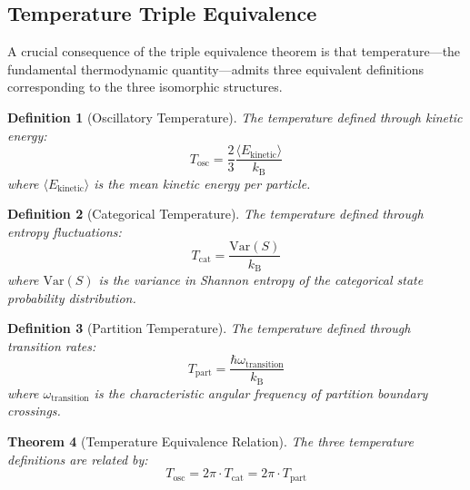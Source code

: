 \documentclass[twocolumn,10pt]{article}
\newtheorem{theorem}{Theorem}[section]
\newtheorem{definition}[theorem]{Definition}
\theoremstyle{remark}
\newcommand{\kB}{k_{\mathrm{B}}}
\begin{document}
\subsection{Temperature Triple Equivalence}

A crucial consequence of the triple equivalence theorem is that temperature---the fundamental thermodynamic quantity---admits three equivalent definitions corresponding to the three isomorphic structures.

\begin{definition}[Oscillatory Temperature]
The temperature defined through kinetic energy:
\begin{equation}
T_{\mathrm{osc}} = \frac{2}{3} \frac{\langle E_{\mathrm{kinetic}} \rangle}{\kB}
\end{equation}
where $\langle E_{\mathrm{kinetic}} \rangle$ is the mean kinetic energy per particle.
\end{definition}

\begin{definition}[Categorical Temperature]
The temperature defined through entropy fluctuations:
\begin{equation}
T_{\mathrm{cat}} = \frac{\mathrm{Var}(S)}{\kB}
\end{equation}
where $\mathrm{Var}(S)$ is the variance in Shannon entropy of the categorical state probability distribution.
\end{definition}

\begin{definition}[Partition Temperature]
The temperature defined through transition rates:
\begin{equation}
T_{\mathrm{part}} = \frac{\hbar \omega_{\mathrm{transition}}}{\kB}
\end{equation}
where $\omega_{\mathrm{transition}}$ is the characteristic angular frequency of partition boundary crossings.
\end{definition}

\begin{theorem}[Temperature Equivalence Relation]
\label{thm:temp_equiv}
The three temperature definitions are related by:
\begin{equation}
\boxed{T_{\mathrm{osc}} = 2\pi \cdot T_{\mathrm{cat}} = 2\pi \cdot T_{\mathrm{part}}}
\end{equation}
\end{theorem}
\end{document}

